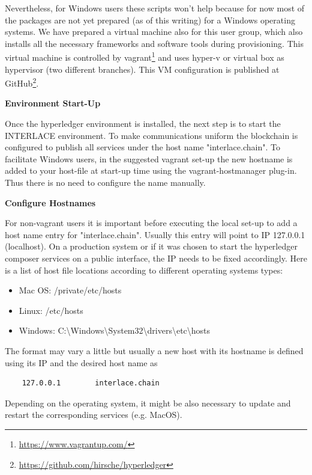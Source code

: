 Nevertheless, for Windows users these scripts won't help because for now most of the packages are not yet prepared (as of this writing) for a Windows operating systems. We have prepared a virtual machine also for this user group, which also installs all the necessary frameworks and software tools during provisioning. This virtual machine is controlled by vagrant\footnote{\url{https://www.vagrantup.com/}} and uses hyper-v or virtual box as hypervisor (two different branches). This VM configuration is published at GitHub\footnote{\url{https://github.com/hirsche/hyperledger}}.

\textbf{Environment Start-Up}

Once the hyperledger environment is installed, the next step is to start the INTERLACE environment. To make communications uniform the blockchain is configured to publish all services under the host name "interlace.chain". To facilitate Windows users, in the suggested vagrant set-up the new hostname is added to your host-file at start-up time using the vagrant-hostmanager plug-in. Thus there is no need to configure the name manually.

\textbf{Configure Hostnames}

For non-vagrant users it is important before executing the local set-up to add a host name entry for "interlace.chain". Usually this entry will point to IP 127.0.0.1 (localhost). On a production system or if it was chosen to start the hyperledger composer services on a public interface, the IP needs to be fixed accordingly. Here is a list of host file locations according to different operating systems types:

\begin{itemize}
	\item Mac OS: /private/etc/hosts
    \item Linux: /etc/hosts
    \item Windows: C:\textbackslash Windows\textbackslash System32\textbackslash drivers\textbackslash etc\textbackslash hosts
\end{itemize}

The format may vary a little but usually a new host with its hostname is defined using its IP and the desired host name as

\begin{lstlisting}
	127.0.0.1        interlace.chain
\end{lstlisting}
Depending on the operating system, it might be also necessary to update and restart the corresponding services (e.g. MacOS).

